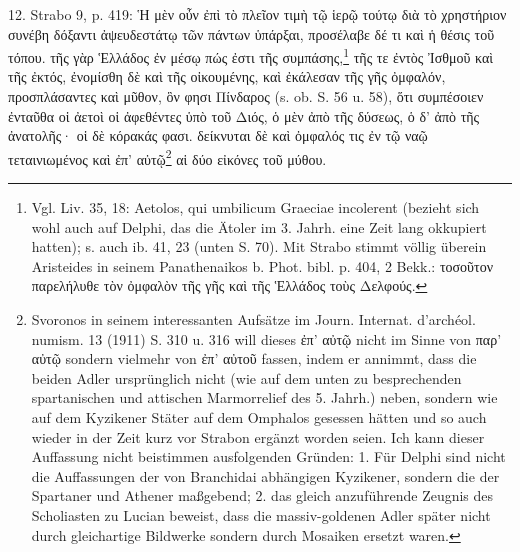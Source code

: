 \documentclass[a4paper, 11pt, oneside]{article}
\begin{document}
12. Strabo 9, p. 419: Ἡ μὲν οὖν ἐπὶ τὸ πλεῖον τιμὴ τῷ ἱερῷ τούτῳ διὰ τὸ χρηστήριον συνέβη δόξαντι ἀψευδεστάτῳ τῶν πάντων ὑπάρξαι, προσέλαβε δέ τι καὶ ἡ θέσις τοῦ τόπου. τῆς γὰρ Ἑλλάδος ἐν μέσῳ πώς ἐστι τῆς συμπάσης,\footnote{Vgl. Liv. 35, 18: Aetolos, qui umbilicum Graeciae incolerent (bezieht sich wohl auch auf Delphi, das die Ätoler im 3. Jahrh. eine Zeit lang okkupiert hatten); s. auch ib. 41, 23 (unten S. 70). Mit Strabo stimmt völlig überein Aristeides in seinem Panathenaikos b. Phot. bibl. p. 404, 2 Bekk.: τοσοῦτον παρελήλυθε τὸν ὀμφαλὸν τῆς γῆς καὶ τῆς Ἑλλάδος τοὺς Δελφούς.} τῆς τε ἐντὸς Ἰσθμοῦ καὶ τῆς ἐκτός, ἐνομίσθη δὲ καὶ τῆς οἰκουμένης, καὶ ἐκάλεσαν τῆς γῆς ὀμφαλόν, προσπλάσαντες καὶ μῦθον, ὃν φησι Πίνδαρος (s. ob. S. 56 u. 58), ὅτι συμπέσοιεν ἐνταῦθα οἱ ἀετοὶ οἱ ἀφεθέντες ὑπὸ τοῦ Διός, ὁ μὲν ἀπὸ τῆς δύσεως, ὁ δ' ἀπὸ τῆς ἀνατολῆς· οἱ δὲ κόρακάς φασι. δείκνυται δὲ καὶ ὀμφαλός τις ἐν τῷ ναῷ τεταινιωμένος καὶ ἐπ' αὐτῷ\footnote{Svoronos in seinem interessanten Aufsätze im Journ. Internat. d'archéol. numism. 13 (1911) S. 310 u. 316 will dieses ἐπ' αὐτῷ nicht im Sinne von παρ' αὐτῷ sondern vielmehr von ἐπ' αὐτοῦ fassen, indem er annimmt, dass die beiden Adler ursprünglich nicht (wie auf dem unten zu besprechenden spartanischen und attischen Marmorrelief des 5. Jahrh.) neben, sondern wie auf dem Kyzikener Stäter auf dem Omphalos gesessen hätten und so auch wieder in der Zeit kurz vor Strabon ergänzt worden seien. Ich kann dieser Auffassung nicht beistimmen ausfolgenden Gründen: 1. Für Delphi sind nicht die Auffassungen der von Branchidai abhängigen Kyzikener, sondern die der Spartaner und Athener maßgebend; 2. das gleich anzuführende Zeugnis des Scholiasten zu Lucian beweist, dass die massiv-goldenen Adler später nicht durch gleichartige Bildwerke sondern durch Mosaiken ersetzt waren.} αἱ δύο εἰκόνες τοῦ μύθου.
\end{document}
